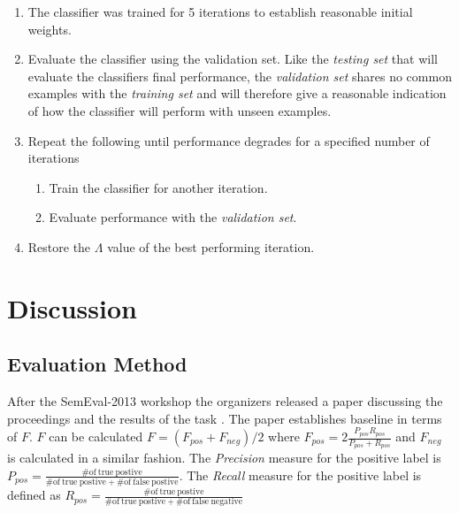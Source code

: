 \documentclass[final,3p,12pt]{elsarticle}
\begin{document}
\begin{enumerate}

    \item The classifier was trained for 5 iterations to establish reasonable
        initial weights.

    \item Evaluate the classifier using the validation set. Like the
        \textit{testing set} that will evaluate the classifiers final
        performance, the \textit{validation set} shares no common examples with
        the \textit{training set} and will therefore give a reasonable
        indication of how the classifier will perform with unseen examples.

    \item Repeat the following until performance degrades for a specified
        number of iterations

    \begin{enumerate}

        \item Train the classifier for another iteration.

        \item Evaluate performance with the \textit{validation set}.

    \end{enumerate}

    \item Restore the $\Lambda$ value of the best performing iteration.

\end{enumerate}

\section{Discussion}

\subsection{Evaluation Method}

After the SemEval-2013 workshop the organizers released a paper discussing the
proceedings and the results of the task \cite{Nakov2013}. The paper establishes
baseline in terms of $F$. $F$ can be calculated $F = (F_{pos} + F_{neg}) / 2$
where $F_{pos} = 2 \frac{P_{pos}R_{pos}}{P_{pos} + R_{pos}}$ and $F_{neg}$ is
calculated in a similar fashion. The \textit{Precision} measure for the
positive label is $P_{pos} = \frac{\mathrm{\# of\ true\ postive}}{\mathrm{\#
of\ true\ postive} + \mathrm{\# of\ false\ postive} }$. The \textit{Recall}
measure for the positive label is defined as $R_{pos} = \frac{\mathrm{\# of\
true\ postive}}{\mathrm{\# of\ true\ postive} + \mathrm{\# of\ false\ negative}
}$
\end{document}
